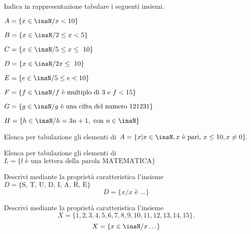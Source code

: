 \begin{esercizio}
 \label{ese:6.3}
Indica in rappresentazione tabulare i seguenti insiemi.
\TabPositions{7.5cm}
\begin{enumeratea}
 \item $A=\{x\in\insN/x<10\}$\tab\dotfill
 \item $B=\{x\in\insN/2\le x<5\}$\tab\dotfill
 \item $C=\{x\in\insN/5\le x\le~10\}$\tab\dotfill
 \item $D=\{x\in\insN/2x\le~10\}$ \tab\dotfill
 \item $E=\{e\in\insN/5\le e<10\}$\tab\dotfill
 \item $F=\{f\in\insN/f\text{ è multiplo di~3 e } f<15\}$\tab\dotfill
 \item $G=\{g\in\insN/g\text{ è una cifra del numero }121231\}$\tab\dotfill
 \item $H=\{h\in\insN/h=3n+1,\text{ con }n\in\insN\}$\tab\dotfill
\end{enumeratea}
\end{esercizio}

\begin{esercizio}
\label{ese:6.4}
Elenca per tabulazione gli elementi di~$A=\{x|x\in\insN, x\text{ è pari, 
}x\leq10, x\neq0\}.$
\end{esercizio}

\begin{esercizio}
\label{ese:6.5}
Elenca per tabulazione gli elementi di~$L=\{l\text{ è una lettera della parola 
MATEMATICA}\}$
\end{esercizio}


\begin{esercizio}
\label{ese:6.6}
Descrivi mediante la proprietà caratteristica
l'insieme~$D= \{\text{S, T, U, D, I, A, R, E}\}$
\[D=\{x/ x\text{ è }\ldots\}\]
\end{esercizio}


\begin{esercizio}
\label{ese:6.7}
Descrivi mediante la proprietà caratteristica l'insieme
\[X=\{1, 2, 3, 4, 5, 6, 7, 8, 9, 10, 11, 12, 13, 14, 15\}.\]
\[X=\{x\in\insN/x\ldots\}\]
\end{esercizio}

